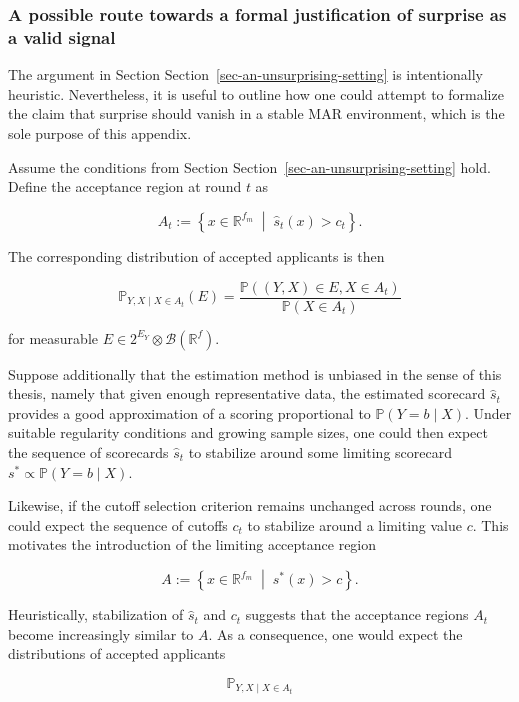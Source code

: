 \documentclass[
  12pt,
]{article}
\begin{document}
\subsubsection{A possible route towards a formal justification of
surprise as a valid
signal}\label{a-possible-route-towards-a-formal-justification-of-surprise-as-a-valid-signal}

The argument in Section Section~\ref{sec-an-unsurprising-setting} is
intentionally heuristic. Nevertheless, it is useful to outline how one
could attempt to formalize the claim that surprise should vanish in a
stable MAR environment, which is the sole purpose of this appendix.

Assume the conditions from Section
Section~\ref{sec-an-unsurprising-setting} hold. Define the acceptance
region at round \(t\) as

\[
A_t
:=
\left\{
x \in \mathbb{R}^{f_m}
\;\middle|\;
\hat{s}_t(x) > c_t
\right\}.
\]

The corresponding distribution of accepted applicants is then

\[
\mathbb{P}_{Y,X \mid X \in A_t}(E)
=
\frac{
    \mathbb{P}\left((Y,X)\in E, X\in A_t\right)
}{
    \mathbb{P}\left(X\in A_t\right)
}
\]

for measurable \(E \in 2^{E_Y} \otimes \mathcal{B}(\mathbb{R}^f)\).

Suppose additionally that the estimation method is unbiased in the sense
of this thesis, namely that given enough representative data, the
estimated scorecard \(\hat{s}_t\) provides a good approximation of a
scoring proportional to \(\mathbb{P}(Y=b\mid X)\). Under suitable
regularity conditions and growing sample sizes, one could then expect
the sequence of scorecards \(\hat{s}_t\) to stabilize around some
limiting scorecard \(s^* \propto \mathbb{P}(Y=b\mid X)\).

Likewise, if the cutoff selection criterion remains unchanged across
rounds, one could expect the sequence of cutoffs \(c_t\) to stabilize
around a limiting value \(c\). This motivates the introduction of the
limiting acceptance region

\[
A
:=
\left\{
x \in \mathbb{R}^{f_m}
\;\middle|\;
s^*(x) > c
\right\}.
\]

Heuristically, stabilization of \(\hat{s}_t\) and \(c_t\) suggests that
the acceptance regions \(A_t\) become increasingly similar to \(A\). As
a consequence, one would expect the distributions of accepted applicants

\[
\mathbb{P}_{Y,X \mid X \in A_t}
\]
\end{document}
